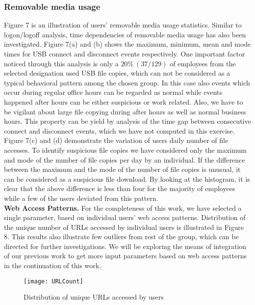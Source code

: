 \documentclass[conference,draftclsnofoot,onecolumn]{IEEEtran}%
\begin{document}
\subsubsection{Removable media usage}
Figure 7 is an illustration of users' removable media usage statistics. Similar to logon/logoff analysis, time dependencies of removable media usage has also been investigated. Figure 7(a) and (b) shows the maximum, minimum, mean and mode times for USB connect and disconnect events respectively. One important factor noticed through this analysis is only a $20\%\ (37/129)$ of employees from the selected designation used USB file copies, which can not be considered as a typical behavioral pattern among the chosen group. In this case also events which occur during regular office hours can be regarded as normal while events happened after hours can be either suspicious or work related. Also, we have to be vigilant about large file copying during after hours as well as normal business hours. This property can be yield by analysis of the time gap between consecutive connect and disconnect events, which we have not computed in this exercise. Figure 7(c) and (d) demonstrate the variation of users daily number of file accesses. To identify suspicious file copies we have considered only the maximum and mode of the number of file copies per day by an individual. If the difference between the maximum and the mode of the number of file copies is unusual, it can be considered as a suspicious file download. By looking at the histogram, it is clear that the above difference is less than four for the majority of employees while a few of the users deviated from this pattern.\\

\smallskip\noindent
\textbf{Web Access Patterns.} For the completeness of this work, we have selected a single parameter, based on individual users' web access patterns. Distribution of the unique number of URLs accessed by individual users is illustrated in Figure 8. This results also illustrate few outliers from rest of the group, which can be directed for further investigations. We will be exploring the means of integration of our previous work \cite{Anagi} to get more input parameters based on web access patterns in the continuation of this work.

\begin{figure}[h]
\centering
\texttt{[image: URLCount]}
\vspace{-5pt}
\caption{Distribution of unique URLs accessed by users}
\label{figure 8}
\vspace{-5pt}
\end{figure}
\end{document}
